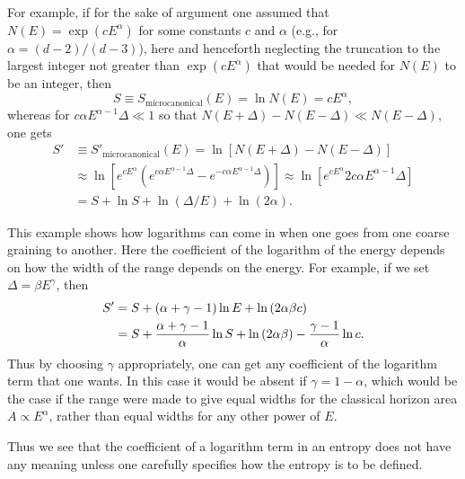 \documentclass[12pt]{article} \usepackage{latexsym}
\begin{document}
For example, if for the sake of argument one assumed that $N(E) =
\exp{(cE^\alpha)}$ for some constants $c$ and $\alpha$ (e.g., for
$\alpha = (d-2)/(d-3)$), here and henceforth neglecting the truncation
to the largest integer not greater than $\exp{(cE^\alpha)}$ that would
be needed for $N(E)$ to be an integer, then
 \begin{equation}
 S \equiv S_{\mathrm{microcanonical}}(E) = \ln{N(E)} = cE^\alpha,
 \label{eq:27}
 \end{equation}
whereas for $c\alpha E^{\alpha-1} \Delta \ll 1$ so that
$N(E+\Delta)-N(E-\Delta) \ll N(E-\Delta)$, one gets
 \begin{equation}
 \begin{aligned}
 S' &\equiv S'_{\mathrm{microcanonical}}(E)
    = \ln{[N(E+\Delta)-N(E-\Delta)]}  \\
    &\approx \ln{[e^{cE^\alpha}(e^{c\alpha E^{\alpha-1}\Delta}
                               - e^{-c\alpha E^{\alpha-1}\Delta})]}
    \approx \ln{[e^{cE^\alpha} 2c\alpha E^{\alpha-1} \Delta]}
     \\
    &= S + \ln{S} + \ln{(\Delta/E)} + \ln{(2\alpha)}.
\end{aligned}
 \label{eq:28}
 \end{equation}
 
This example shows how logarithms can come in when one goes from one
coarse graining to another.  Here the coefficient of the logarithm of
the energy depends on how the width of the range depends on the energy. 
For example, if we set $\Delta = \beta E^\gamma$, then
 \begin{equation}
 \begin{aligned}
 S' &= S + (\alpha+\gamma-1)\ln{E} + \ln{(2\alpha\beta c)}\\
    &= S + {\alpha+\gamma-1 \over \alpha} \ln{S} + \ln{(2\alpha\beta)}
        - {\gamma-1\over\alpha} \ln{c}.
\end{aligned}
\label{eq:29}
 \end{equation}
Thus by choosing $\gamma$ appropriately, one can get any coefficient of
the logarithm term that one wants.  In this case it would be absent if
$\gamma = 1-\alpha$, which would be the case if the range were made to
give equal widths for the classical horizon area $A \propto E^\alpha$,
rather than equal widths for any other power of $E$.

Thus we see that the coefficient of a logarithm term in an entropy does
not have any meaning unless one carefully specifies how the entropy is
to be defined.
\end{document}
